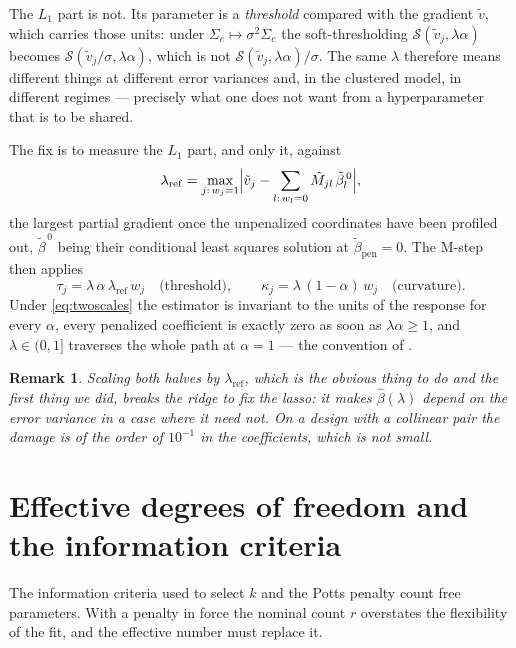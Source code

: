 \documentclass[11pt,a4paper]{article}
\newtheorem{remark}{Remark}
\newcommand{\Sig}{\Sigma}
\newcommand{\Se}{\Sig_{e}}
\begin{document}
The $L_1$ part is not. Its parameter is a \emph{threshold} compared with the
gradient $\tilde v$, which carries those units: under
$\Se \mapsto \sigma^2\Se$ the soft-thresholding
$\mathcal{S}(\tilde v_j, \lambda\alpha)$ becomes
$\mathcal{S}(\tilde v_j/\sigma, \lambda\alpha)$, which is not
$\mathcal{S}(\tilde v_j, \lambda\alpha)/\sigma$. The same $\lambda$ therefore
means different things at different error variances and, in the clustered
model, in different regimes --- precisely what one does not want from a
hyperparameter that is to be shared.

The fix is to measure the $L_1$ part, and only it, against
\begin{equation}
  \lambda_{\mathrm{ref}} =
  \max_{j:\,w_j=1}\Bigl| \tilde v_j
    - \sum_{l:\,w_l=0} \tilde M_{jl}\,\tilde\beta_l^{\,0} \Bigr| ,
  \label{eq:lref}
\end{equation}
the largest partial gradient once the unpenalized coordinates have been
profiled out, $\tilde\beta^{\,0}$ being their conditional least squares
solution at $\tilde\beta_{\mathrm{pen}} = 0$. The M-step then applies
\begin{equation}
  \tau_j = \lambda\,\alpha\,\lambda_{\mathrm{ref}}\, w_j
  \quad\text{(threshold)}, \qquad
  \kappa_j = \lambda\,(1-\alpha)\, w_j
  \quad\text{(curvature)} .
  \label{eq:twoscales}
\end{equation}
Under \eqref{eq:twoscales} the estimator is invariant to the units of the
response for every $\alpha$, every penalized coefficient is exactly zero as
soon as $\lambda\alpha \ge 1$, and $\lambda \in (0,1]$ traverses the whole path
at $\alpha = 1$ --- the convention of \citet{Friedman2010}.

\begin{remark}
Scaling \emph{both} halves by $\lambda_{\mathrm{ref}}$, which is the obvious
thing to do and the first thing we did, breaks the ridge to fix the lasso: it
makes $\hat\beta(\lambda)$ depend on the error variance in a case where it need
not. On a design with a collinear pair the damage is of the order of
$10^{-1}$ in the coefficients, which is not small.
\end{remark}

\section{Effective degrees of freedom and the information criteria}

The information criteria used to select $k$ and the Potts penalty count free
parameters. With a penalty in force the nominal count $r$ overstates the
flexibility of the fit, and the effective number must replace it.
\end{document}
